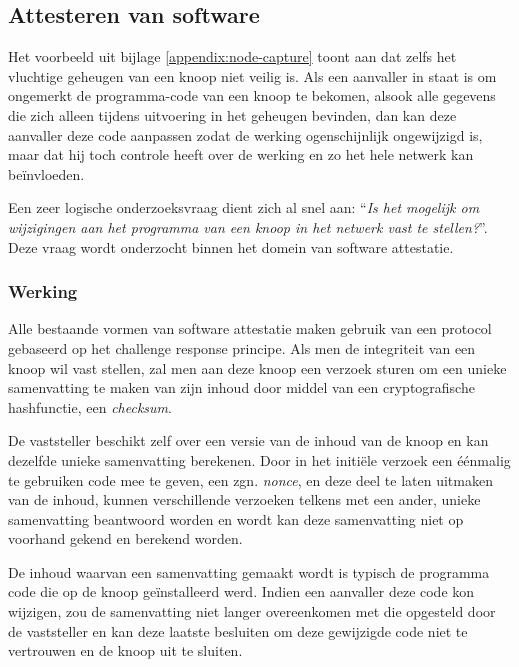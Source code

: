 
\subsection{Attesteren van software}
\label{subsection:attestation}

Het voorbeeld uit bijlage \ref{appendix:node-capture} toont aan dat zelfs het
vluchtige geheugen van een knoop niet veilig is. Als een aanvaller in staat is
om ongemerkt de programma-code van een knoop te bekomen, alsook alle gegevens
die zich alleen tijdens uitvoering in het geheugen bevinden, dan kan deze
aanvaller deze code aanpassen zodat de werking ogenschijnlijk ongewijzigd is,
maar dat hij toch controle heeft over de werking en zo het hele netwerk kan
be\"invloeden.

Een zeer logische onderzoeksvraag dient zich al snel aan: ``\emph{Is het
mogelijk om wijzigingen aan het programma van een knoop in het netwerk vast te
stellen?}''. Deze vraag wordt onderzocht binnen het domein van software
attestatie.

\subsubsection*{Werking}

Alle bestaande vormen van software attestatie maken gebruik van een protocol
gebaseerd op het challenge response principe. Als men de integriteit van een
knoop wil vast stellen, zal men aan deze knoop een verzoek sturen om een unieke
samenvatting te maken van zijn inhoud door middel van een cryptografische
hashfunctie, een \emph{checksum}.

De vaststeller beschikt zelf over een versie van de inhoud van de knoop en kan
dezelfde unieke samenvatting berekenen. Door in het initi\"ele verzoek een
\'e\'enmalig te gebruiken code mee te geven, een zgn. \emph{nonce}, en deze
deel te laten uitmaken van de inhoud, kunnen verschillende verzoeken telkens
met een ander, unieke samenvatting beantwoord worden en wordt kan deze
samenvatting niet op voorhand gekend en berekend worden.

De inhoud waarvan een samenvatting gemaakt wordt is typisch de programma code
die op de knoop ge\"installeerd werd. Indien een aanvaller deze code kon
wijzigen, zou de samenvatting niet langer overeenkomen met die opgesteld door
de vaststeller en kan deze laatste besluiten om deze gewijzigde code niet te
vertrouwen en de knoop uit te sluiten.

